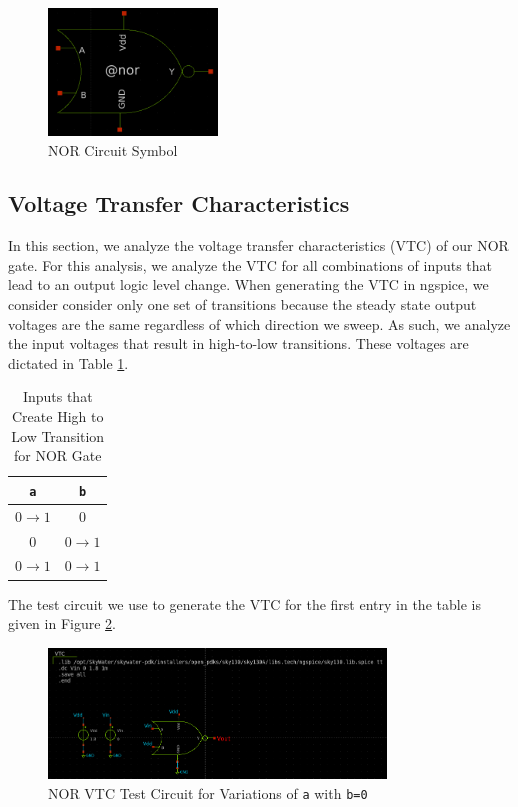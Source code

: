 \documentclass[fleqn]{article}
\begin{document}
	\begin{figure}[H]
		\centerline{\includegraphics[width=0.4\textwidth]{nor_symbol.png}}
		\caption{NOR Circuit Symbol}
		\label{fig::nor_symbol}
	\end{figure}

	\subsection{Voltage Transfer Characteristics}
	
	In this section, we analyze the voltage transfer characteristics (VTC) of our NOR gate. For this analysis, we analyze the VTC for all combinations of inputs that lead to an output logic level change. When generating the VTC in ngspice, we consider consider only one set of transitions because the steady state output voltages are the same regardless of which direction we sweep. As such, we analyze the input voltages that result in high-to-low transitions. These voltages are dictated in Table \ref{table::nor_gate_high_to_low_transitions}.
	
	\begin{table}[H]
	\begin{center}
	\caption{Inputs that Create High to Low Transition for NOR Gate}
	\label{table::nor_gate_high_to_low_transitions}
	\begin{tabular}{| c | c |}
		\hline
		\texttt{a} & \texttt{b} \\
		\hline	
		$0 \rightarrow 1$ & $0$\\
		\hline	
		$0$ & $0 \rightarrow 1$\\
		\hline	
		$0 \rightarrow 1$ & $0 \rightarrow 1$\\
		\hline
	\end{tabular}
	\end{center}
	\end{table}
	
	The test circuit we use to generate the VTC for the first entry in the table is given in Figure \ref{fig::nor_vtc_test_sweep_va}.
	
	\begin{figure}[H]
		\centerline{\includegraphics[width=0.8\textwidth]{nor_vtc_test_sweep_va.png}}
		\caption{NOR VTC Test Circuit for Variations of \texttt{a} with \texttt{b=0}}
		\label{fig::nor_vtc_test_sweep_va}
	\end{figure}	
	
\end{document}
